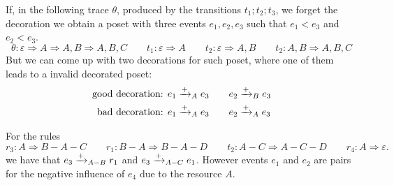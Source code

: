 
\begin{example}
  If, in the following trace $\theta$, produced by the transitions $t_1;t_2;t_3$, we forget the decoration we obtain a poset with three events $e_1,e_2,e_3$ such that $e_1<e_3$ and $e_2<e_3$.
  \[
  \theta:\varepsilon \Rightarrow A \Rightarrow A,B\Rightarrow A,B,C\qquad t_1: \varepsilon \Rightarrow A\qquad t_2: \varepsilon\Rightarrow A,B\qquad t_2: A,B\Rightarrow A,B,C
  \]
  But we can come up with two decorations for such poset, where one of them leads to a invalid decorated poset:
  \begin{align*}
  \text{good decoration: }&e_1\mathrel{\xrightarrow{+}}_A e_3\qquad e_2\mathrel{\xrightarrow{+}}_B e_3\\
  \text{bad decoration: }&e_1\mathrel{\xrightarrow{+}}_A e_3\qquad e_2\mathrel{\xrightarrow{+}}_A e_3
  \end{align*}
\end{example}

\begin{example}
  For the rules
  \[
  r_3: A \Rightarrow B-A-C\qquad r_1: B-A\Rightarrow B-A-D \qquad t_2: A-C\Rightarrow A-C-D\qquad r_4: A\Rightarrow \varepsilon.
  \]
  we have that $e_3\mathrel{\xrightarrow{+}}_{A-B} r_1$ and $e_3\mathrel{\xrightarrow{+}}_{A-C} e_1$. However events $e_1$ and $e_2$ are pairs for the negative influence of $e_4$ due to the resource $A$.
\end{example}

